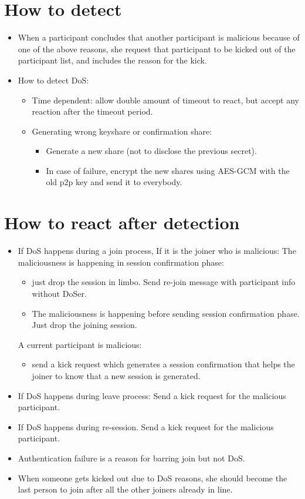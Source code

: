 \documentclass[11pt]{article}
\begin{document}
\section{How to detect}
\label{sec-4}
\begin{itemize}
\item When a participant concludes that another participant is malicious
because of one of the above reasons, she request that participant to be 
kicked out of the participant list, and includes the reason for the kick.
\item How to detect DoS:
\begin{itemize}
\item Time dependent: allow double amount of timeout to react, but accept any reaction after the timeout period.
\item Generating wrong keyshare or confirmation share:
\begin{itemize}
\item Generate a new share (not to disclose the previous secret).
\item In case of failure, encrypt the new shares using AES-GCM with the old p2p key and send it to everybody.
\end{itemize}
\end{itemize}
\end{itemize}

\section{How to react after detection}
\label{sec-5}
\begin{itemize}
\item If DoS happens during a join process, 
If it is the joiner who is malicious:
   The maliciousness is happening in session confirmation phase:
\begin{itemize}
\item just drop the session in limbo. Send re-join message with participant info without DoSer.
\item The maliciousness is happening before sending session confirmation phase. Just drop the joining session.
\end{itemize}
A current participant is malicious:
\begin{itemize}
\item send a kick request which generates a session confirmation that helps the joiner to know that a new session is generated.
\end{itemize}

\item If DoS happens during leave process:
Send a kick request for the malicious participant.

\item If DoS happens during re-session.
Send a kick request for the malicious participant.

\item Authentication failure is a reason for barring join but not DoS.

\item When someone gets kicked out due to DoS reasons, she should become the 
last person to join after all the other joiners already in line.
\end{itemize}
\end{document}
